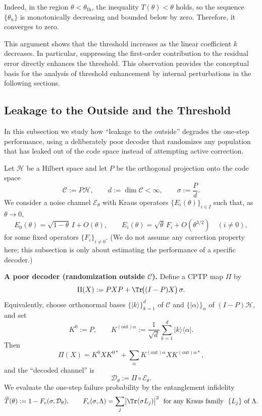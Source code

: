 \documentclass[12pt]{article}
\theoremstyle{definition} %
\theoremstyle{plain} %
\theoremstyle{remark} %
\theoremstyle{underline}
\begin{document}
Indeed, in the region $\theta<\theta_{\mathrm{th}}$, the inequality $T(\theta)<\theta$ holds, so the sequence $\{\theta_n\}$ is monotonically decreasing and bounded below by zero.
Therefore, it converges to zero.

This argument shows that the threshold increases as the linear coefficient $k$ decreases.
In particular, suppressing the first-order contribution to the residual error directly enhances the threshold.
This observation provides the conceptual basis for the analysis of threshold enhancement by internal perturbations in the following sections.

\subsection{Leakage to the Outside and the Threshold}

In this subsection we study how ``leakage to the outside'' degrades the one-step performance, using a deliberately poor decoder that randomizes any population that has leaked out of the code space instead of attempting active correction.

Let $\mathcal H$ be a Hilbert space and let $P$ be the orthogonal projection onto the code space
\[
    \mathcal C:=P\mathcal H,\qquad d:=\dim \mathcal C<\infty,\qquad \sigma:=\frac{P}{d}.
\]
We consider a noise channel $\mathcal E_\theta$ with Kraus operators
$\{E_i(\theta)\}_{i\in I}$ such that, as $\theta\to 0$,
\[
    E_0(\theta)=\sqrt{1-\theta}\,I+O(\theta),\qquad
    E_i(\theta)=\sqrt{\theta}\,F_i+O(\theta^{3/2})\quad (i\neq 0),
\]
for some fixed operators $\{F_i\}_{i\neq 0}$.
(We do not assume any correction property here; this subsection is only about estimating the performance of a specific decoder.)

\medskip

\noindent
\textbf{A poor decoder (randomization outside $\mathcal C$).}
Define a CPTP map $\Pi$ by
\begin{equation}\label{eq:poor-decoder}
    \Pi(X):=PXP+\Tr\!\bigl((I-P)X\bigr)\,\sigma.
\end{equation}
Equivalently, choose orthonormal bases $\{|k\rangle\}_{k=1}^d$ of $\mathcal C$ and $\{|\alpha\rangle\}_\alpha$ of $(I-P)\mathcal H$, and set
\[
    K^0:=P,\qquad
    K^{(\mathrm{out})\alpha}:=\frac{1}{\sqrt d}\sum_{k=1}^d |k\rangle\langle \alpha|.
\]
Then
\[
    \Pi(X)=K^0XK^{0*}+\sum_\alpha K^{(\mathrm{out})\alpha}XK^{(\mathrm{out})\alpha*},
\]
and the ``decoded channel'' is
\[
    \mathcal D_\theta:=\Pi\circ \mathcal E_\theta.
\]
We evaluate the one-step failure probability by the entanglement infidelity
\[
    \widetilde T(\theta):=1-F_e(\sigma,\mathcal D_\theta),
    \qquad
    F_e(\sigma,\Lambda)=\sum_j\bigl|\Tr(\sigma L_j)\bigr|^2
    \ \text{ for any Kraus family }\ \{L_j\}\ \text{of }\Lambda.
\]
\end{document}
